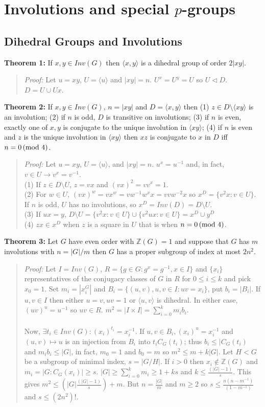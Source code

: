\chapter{Involutions and special $p$-groups}
\section{Dihedral Groups and Involutions}
{\bf Theorem 1:}
If $x, y \in Inv(G)$ then $ \langle x, y \rangle $ is a dihedral group of order $2|xy|$.
\begin{quote}
\emph{Proof:}
Let $u=xy$, $U= \langle u \rangle $ and $|xy|=n$. $U^x=U^y=U$ so $U \lhd D$.  $D= U \cup Ux$.
\end{quote}
{\bf Theorem 2:}
If $x, y \in Inv(G)$, $n=|xy|$ and $D= \langle x, y \rangle $ then 
(1) $z \in D \setminus \langle xy \rangle $ is an
involution; (2) if $n$ is odd, $D$ is transitive on involutions;  
(3) if $n$ is even,
exactly one of $x, y$ is conjugate to the unique involution in $ \langle xy \rangle $;
(4) if $n$ is even
and $z$ is the unique involution in $ \langle xy \rangle $ then $xz$ is conjugate to 
$x$ in $D$ iff
$n= 0 \thinspace \textnormal{(mod } 4 \textnormal{)}$.
\begin{quote}
\emph{Proof:}
Let $u=xy$, $U= \langle u \rangle $, and $|xy|=n$.  $u^x=u^{-1}$ and, 
in fact, $v \in U \rightarrow v^x= v^{-1}$.
\\
(1) If $z \in D \setminus U$, $z= vx$ and $(vx)^2=vv^x=1$.
\\
(2) For $w \in U$, $(vx)^w = v x^w = v w^{-1} w^x x =v v w^{-2} x$ so
$x^D= \{ v^2x: v \in U \}$.
If $n$ is odd, $U$ has no involutions, so $x^D = Inv(D)= D \setminus U$.\\
(3) If $ux=y$, $D \setminus U = \{v^2x: v \in U\} \cup \{v^2ux: v \in U \}= x^D \cup y^D$\\
(4) $zx \in x^D$ when $z$ is a square in $U$ that is when $n=0 \thinspace \textnormal{(mod } 4 \textnormal{)}$.
\end{quote}
{\bf Theorem 3:}
Let $G$ have even order with ${\mathbb Z}(G)=1$ and suppose
that $G$ has $m$ involutions with $n=|G|/m$ then
$G$ has a proper subgroup of index at most $2n^2$.
\begin{quote}
\emph{Proof:}
Let $I= Inv(G)$, $R= \{ g \in G: g^x=g^{-1}, x \in I \}$ and $\{x_i \}$ representatives of
the conjugacy classes of $G$ in $R$ for $0 \le i \le k$ and pick $x_0=1$.  Set $m_i= |x_i^G|$
and $B_i= \{ (u, v), u,v \in I: uv= x_i \}$, put $b_i= |B_i|$.  If $u,v \in I$ then either
$u=v, uv=1$ or $ \langle u,v \rangle $ is dihedral.  
In either case, $(uv)^u= u^{-1}$ so $uv \in R$.
$m^2 = |I \times I| = \sum_{i=0}^k m_i b_i$.
\\
\\
Now, $\exists t_i \in Inv(G): (x_i)^{t_i}=x_i^{-1}$.  If $u,v \in B_i, (x_i)^u=x_i^{-1}$
and $(u,v) \mapsto u$ is an injection from $B_i$ into $t_iC_G(t_i)$; thus 
$b_i \le |C_G(t_i)$ and $m_ib_i \le |G|$, in fact, $m_0=1$ and $b_0=m$ so
$m^2 \le m + k|G|$.  Let $H<G$ be a subgroup of minimal index, $s=|G/H|$.
If $i > 0$ then $x_i \notin {\mathbb Z}(G)$ and $m_i =|G:C_G(x_i)| \ge s$.
$|G| \ge \sum_{i=0}^k m_i \ge 1+ks$ and $k \le {\frac {(|G|-1)} {s}}$.  This gives
$m^2 \le (|G|{\frac {(|G|-1)} {s}})+m$.  But $n={\frac {|G|} {m}}$ and $m \ge 2$ so
$s \le {\frac {n(n-m^{-1})} {(1-m^{-1})}}$ and $s \le (2 n^2)!$.
\end{quote}
